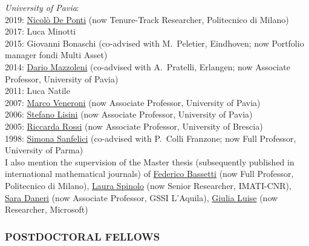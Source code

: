 \documentclass[reqno,11pt]{article}
\let\mysec\subsubsection
\let\mysec\subsubsection
\theoremstyle{plain}
\begin{document}
\hangindent \parindent
\noindent \emph{University of Pavia}:\\
2019:
\href{https://sites.google.com/view/nicolodeponti}{Nicol\`o
De Ponti}
(now Tenure-Track Researcher, Politecnico di Milano)\\
2017:
Luca
Minotti\\
2015:
Giovanni
Bonaschi (co-advised with M.~Peletier, Eindhoven; now Portfolio manager fondi Multi Asset)\\
2014:
\href{https://dariomazzoleni.weebly.com}{Dario
Mazzoleni} (co-advised with A.~Pratelli, Erlangen;
now Associate Professor, University of Pavia)\\
2011:
Luca
Natile\\
2007:
\href{https://mate.unipv.it/~veneroni/}{Marco
Veneroni}
(now Associate Professor, University of Pavia)\\
2006:
\href{https://mate.unipv.it/lisini/}{Stefano
Lisini}
(now Associate Professor, University of Pavia)\\
2005:
\href{https://riccarda-rossi.unibs.it}{Riccarda
Rossi}
(now Associate Professor, University of Brescia)\\
1998:
\href{https://personale.unipr.it/it/ugovdocenti/person/19220}{Simona
Sanfelici} (co-advised with P.~Colli Franzone;
now Full Professor, University of Parma)\\
%
%
%
%
%
\smallskip\noindent
I also mention the supervision of the Master thesis
(subsequently published in international mathematical journals) of
\href{https://sites.google.com/view/federicobassetti/}{Federico Bassetti} (now Full Professor, Politecnico di Milano),
\href{http://arturo.imati.cnr.it/spinolo/}{Laura Spinolo} (now Senior Researcher, IMATI-CNR),
\href{https://www.gssi.it/people/professors/lectures-maths/item/2297-daneri-sara}{Sara Daneri} (now Associate Professor, GSSI L'Aquila),
\href{https://giulslu.github.io}{Giulia Luise} (now Researcher, Microsoft)


\mysec*{POSTDOCTORAL FELLOWS}
\end{document}
